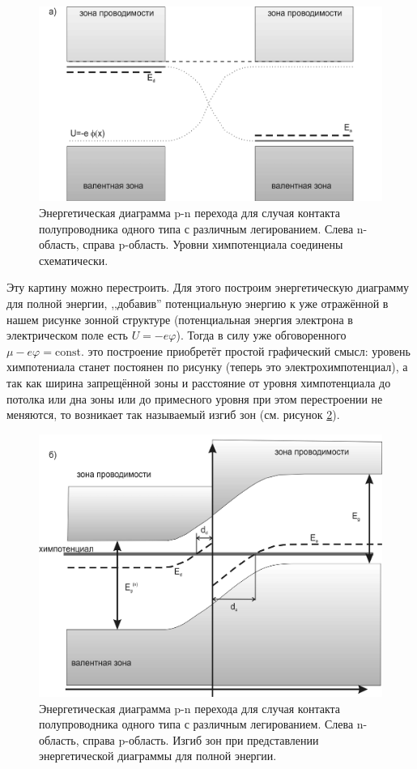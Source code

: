 \documentclass[a4paper, 12pt]{article}
\renewcommand{\phi}{\varphi} %
\begin{document}
\begin{figure}[H]
	\centering
	\includegraphics[width=0.7\linewidth]{2_zones_not_cool}
	\caption{Энергетическая диаграмма p-n перехода для случая контакта полупроводника одного типа с различным легированием. Слева n-область, справа p-область. Уровни химпотенциала соединены схематически.}
	\label{fig:2_zones_not_cool}
\end{figure}

Эту картину можно перестроить. Для этого построим энергетическую диаграмму для полной энергии, ,,добавив'' потенциальную энергию к уже отражённой в нашем рисунке зонной структуре (потенциальная энергия электрона в электрическом поле есть $U = -e\phi$). Тогда в силу уже обговоренного $\mu - e\phi = \text{const.}$ это построение приобретёт простой графический смысл: уровень химпотениала станет постоянен по рисунку (теперь это электрохимпотенциал), а так как ширина запрещённой зоны и расстояние от уровня химпотенциала до потолка или дна зоны или до примесного уровня при этом перестроении не меняются, то возникает так называемый изгиб зон (см. рисунок \ref{fig:2_zones_cool}).

\begin{figure}[H]
	\centering
	\includegraphics[width=0.7\linewidth]{2_zones_cool}
	\caption{Энергетическая диаграмма p-n перехода для случая контакта полупроводника одного типа с различным легированием. Слева n-область, справа p-область. Изгиб зон при представлении энергетической диаграммы для полной энергии.}
	\label{fig:2_zones_cool}
\end{figure}
\end{document}
